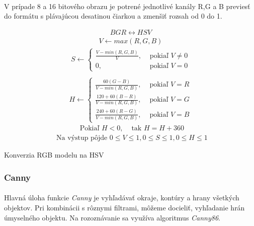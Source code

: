 \documentclass[12pt]{article}
\begin{document}
\paragraph{} 
V prípade 8 a 16 bitového obrazu je potrené jednotlivé kanály R,G a B previesť do formátu s plávajúcou desatinou čiarkou a zmenšiť rozsah od 0 do 1.
\begin{table}
\begin{align*}
BGR \leftrightarrow HSV
\end{align*}
\begin{align*}
V \leftarrow max(R,G,B)
\end{align*}
\begin{align*}
S \leftarrow \begin{cases} \frac{V - min(R,G,B)}{V}, & \text{ pokiaľ } V \neq 0 \\ 0, & \text{ pokiaľ } V = 0 \end{cases} \\
\end{align*}
\begin{align*}
H \leftarrow \begin{cases} \frac{60(G - B)}{V - min(R,G,B)}, & \text{ pokiaľ } V = R \\ \frac{120 + 60(B - R)}{V - min(R,G,B)}, & \text{ pokiaľ } V = G \\ \frac{240 + 60(R - G)}{V - min(R,G,B)}, & \text{ pokiaľ } V = B \end{cases} 
\end{align*}
\begin{align*}
\text{ Pokiaľ } H < 0, & \text{ tak } H = H + 360
\end{align*}
\begin{align*}
\text{ Na výstup pôjde } 0 \le V \le 1, 0 \le S \le 1, 0 \le H \le 1
\end{align*}
\caption{Konverzia RGB modelu na HSV\cite{hsv_wiki_cz}\cite{cvtColor}\cite{OpenCVDoc}}
\label{cvtColorEquals}
\end{table}
\subsubsection{Canny}
\paragraph{}
Hlavná úloha funkcie \emph{Canny} je vyhľadávať okraje, kontúry a hrany všetkých objektov. Pri kombinácii s rôznymi filtrami, môžeme docieliť, vyhľadanie hrán úmyselného objektu.
Na rozoznávanie sa využíva algoritmus \emph{Canny86}.
\cite{canny}
\cite{OpenCVDoc}
\end{document}
